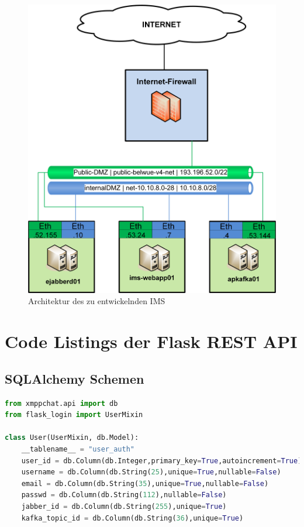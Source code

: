 \documentclass[a4paper,titlepage,halfparskip,12pt]{scrreprt}
\begin{document}
\begin{figure}[h]
	\centering
	\includegraphics[width=.95\linewidth]{images/Studienarbeit-Netzwerkplan}
	\caption{Architektur des zu entwickelnden \ac{IMS}}
	\label{img:ArchitekturIMS}
\end{figure}

\chapter{Code Listings der Flask \acs{REST} \acs{API}}

\section{SQLAlchemy Schemen}

\begin{lstlisting}[language=python, caption={SQLAlchemy Schema für die Tabelle der Benutzerdaten}, label={lst:classUser}]
from xmppchat.api import db
from flask_login import UserMixin

class User(UserMixin, db.Model):
    __tablename__ = "user_auth"
    user_id = db.Column(db.Integer,primary_key=True,autoincrement=True)
    username = db.Column(db.String(25),unique=True,nullable=False)
    email = db.Column(db.String(35),unique=True,nullable=False)
    passwd = db.Column(db.String(112),nullable=False)
    jabber_id = db.Column(db.String(255),unique=True)
    kafka_topic_id = db.Column(db.String(36),unique=True)

\end{lstlisting}
\end{document}
